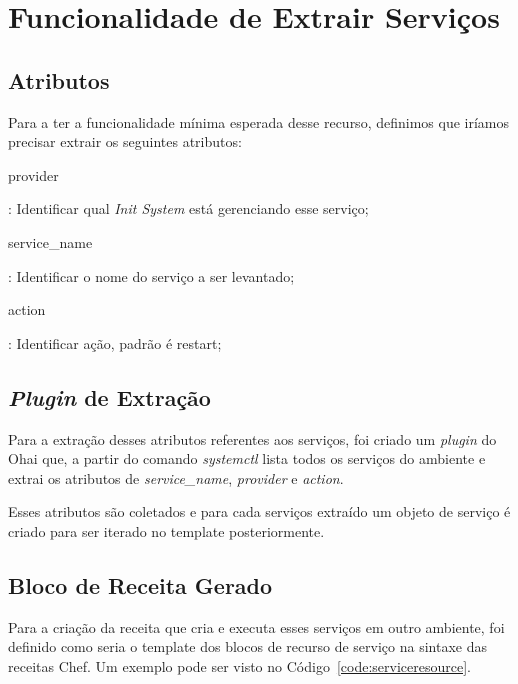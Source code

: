 \section{Funcionalidade de Extrair Serviços}
\label{sec:services}

\subsection{Atributos}

Para a ter a funcionalidade mínima esperada desse recurso, definimos que iríamos precisar
extrair os seguintes atributos:


\begin{itemize}
    {\itshape\item provider}: Identificar qual \textit{Init System} está gerenciando
esse serviço;
    {\itshape\item service\_name}: Identificar o nome do serviço a
ser levantado;
    {\itshape\item action}: Identificar ação, padrão é restart;
\end{itemize}

\subsection{\textit{Plugin} de Extração}
Para a extração desses atributos referentes aos serviços, foi criado um \textit{plugin} do
Ohai que, a partir do comando \textit{systemctl} lista todos os serviços do ambiente
e extrai os atributos de \textit{service\_name}, \textit{provider}
e \textit{action}.

Esses atributos são coletados e para cada serviços extraído um objeto de serviço
é criado para ser iterado no template posteriormente.

\subsection{Bloco de Receita Gerado}
Para a criação da receita que cria e executa esses serviços em outro ambiente, foi 
definido como seria o template dos blocos de recurso de serviço na sintaxe das 
receitas Chef. Um exemplo pode ser visto no Código~\ref{code:serviceresource}.

\noindent\begin{minipage}{\textwidth}
  \lstset{style=shell}
  
\end{minipage}\hfill

